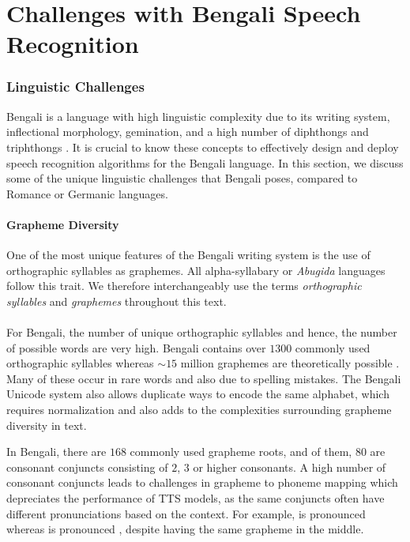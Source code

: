 \chapter{Challenges with Bengali Speech Recognition}


\subsection{Linguistic Challenges}

Bengali is a language with high linguistic complexity due to its writing system, inflectional morphology, gemination, and a high number of diphthongs and triphthongs \cite{bhattacharya2005inflectional}. It is crucial to know these concepts to effectively design and deploy speech recognition algorithms for the Bengali language. In this section, we discuss some of the unique linguistic challenges that Bengali poses, compared to Romance or Germanic languages. 

\subsubsection{Grapheme Diversity}
\label{subsec:alphasyllabary_script}

One of the most unique features of the Bengali writing system is the use of orthographic syllables as graphemes. All alpha-syllabary or \textit{Abugida} languages follow this trait. We therefore interchangeably use the terms \textit{orthographic syllables} and \textit{graphemes} throughout this text.
\\\\
For Bengali, the number of unique orthographic syllables and hence, the number of possible words are very high. Bengali contains over $1300$ commonly used orthographic syllables whereas $\sim15$ million graphemes are theoretically possible \cite{alam2021large}. Many of these occur in rare words and also due to spelling mistakes\cite{sifat2020synthetic}. The Bengali Unicode system also allows duplicate ways to encode the same alphabet, which requires normalization \cite{rashid2010text} and also adds to the complexities surrounding grapheme diversity in text.

In Bengali, there are $168$ commonly used grapheme roots, and of them, $80$ are consonant conjuncts consisting of $2$, $3$ or higher consonants. 
A high number of consonant conjuncts leads to challenges in grapheme to phoneme mapping which depreciates the performance of TTS models, as the same conjuncts often have different pronunciations based on the context. For example, {} is pronounced {} whereas {} is pronounced {}, despite having the same grapheme {} in the middle.

